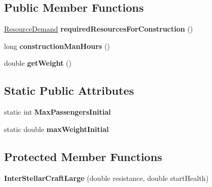 \subsection*{Public Member Functions}
\begin{DoxyCompactItemize}
\item 
\hyperlink{classuniverse_1_1_resource_demand}{Resource\+Demand} {\bfseries required\+Resources\+For\+Construction} ()\hypertarget{classtools_1_1vehicles_1_1space_1_1_inter_stellar_craft_large_af5e6c1910b13e4ae22351fc482055aa9}{}\label{classtools_1_1vehicles_1_1space_1_1_inter_stellar_craft_large_af5e6c1910b13e4ae22351fc482055aa9}

\item 
long {\bfseries construction\+Man\+Hours} ()\hypertarget{classtools_1_1vehicles_1_1space_1_1_inter_stellar_craft_large_a06919f6fe3be9b3ec1f395b8aeca55fd}{}\label{classtools_1_1vehicles_1_1space_1_1_inter_stellar_craft_large_a06919f6fe3be9b3ec1f395b8aeca55fd}

\item 
double {\bfseries get\+Weight} ()\hypertarget{classtools_1_1vehicles_1_1space_1_1_inter_stellar_craft_large_aafa6c2c004f389cc8c5470305c840a50}{}\label{classtools_1_1vehicles_1_1space_1_1_inter_stellar_craft_large_aafa6c2c004f389cc8c5470305c840a50}

\end{DoxyCompactItemize}
\subsection*{Static Public Attributes}
\begin{DoxyCompactItemize}
\item 
static int {\bfseries Max\+Passengers\+Initial}\hypertarget{classtools_1_1vehicles_1_1space_1_1_inter_stellar_craft_large_a3db8ccb24d1cfa104890ddf76122f865}{}\label{classtools_1_1vehicles_1_1space_1_1_inter_stellar_craft_large_a3db8ccb24d1cfa104890ddf76122f865}

\item 
static double {\bfseries max\+Weight\+Initial}\hypertarget{classtools_1_1vehicles_1_1space_1_1_inter_stellar_craft_large_a76f924a8c2f719c478d08dee48404771}{}\label{classtools_1_1vehicles_1_1space_1_1_inter_stellar_craft_large_a76f924a8c2f719c478d08dee48404771}

\end{DoxyCompactItemize}
\subsection*{Protected Member Functions}
\begin{DoxyCompactItemize}
\item 
{\bfseries Inter\+Stellar\+Craft\+Large} (double resistance, double start\+Health)\hypertarget{classtools_1_1vehicles_1_1space_1_1_inter_stellar_craft_large_a601cbbe8ec67110798f5b3bc422c8331}{}\label{classtools_1_1vehicles_1_1space_1_1_inter_stellar_craft_large_a601cbbe8ec67110798f5b3bc422c8331}

\end{DoxyCompactItemize}
